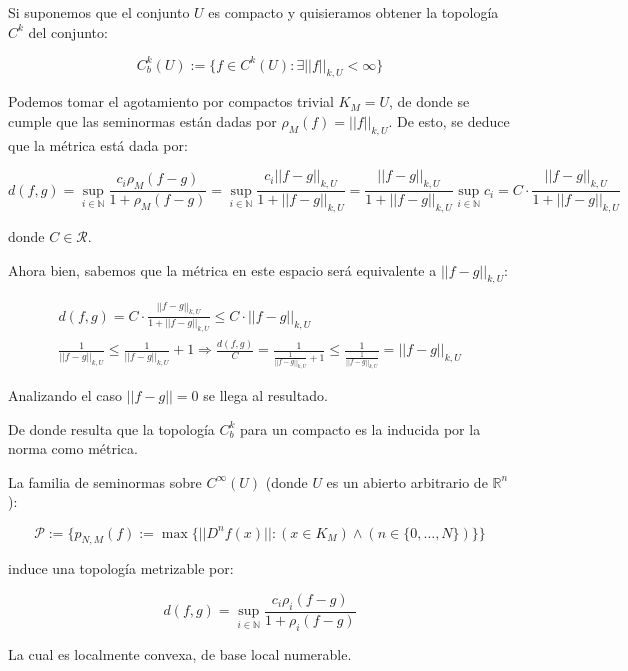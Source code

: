 \begin{rmrk}
	Si suponemos que el conjunto $U$ es compacto y quisieramos obtener la topología $C^k$ del conjunto:
	
	\begin{equation*}
		C^k_b(U) := \{f \in C^k(U): \exists ||f||_{k,U}  < \infty\}
	\end{equation*}
	
	Podemos tomar el agotamiento por compactos trivial $K_M = U$, de donde se cumple que las seminormas están dadas por $\rho_M(f) = ||f||_{k,U}$. De esto, se deduce que la métrica está dada por:
	
	\begin{equation*}
		d(f,g) = \sup_{i \in \mathbb{N}} \frac{c_i \rho_M(f-g)}{1+\rho_M(f-g)} = \sup_{i \in \mathbb{N}} \frac{c_i ||f-g||_{k,U}}{1+||f-g||_{k,U}} = \frac{ ||f-g||_{k,U}}{1+||f-g||_{k,U}} \sup_{i \in \mathbb{N}} c_i  = C\cdot\frac{ ||f-g||_{k,U}}{1+||f-g||_{k,U}}
	\end{equation*}
	
	donde $C\in \mathcal{R}$.
	
	Ahora bien, sabemos que la métrica en este espacio será equivalente a $||f-g||_{k,U}$:
	
	\begin{align*}
		d(f,g) = C\cdot\frac{ ||f-g||_{k,U}}{1+||f-g||_{k,U}} \leq C\cdot ||f-g||_{k,U} \\
		\frac{1}{||f-g||_{k,U}} \leq \frac{1}{||f-g||_{k,U}} + 1 \Rightarrow \frac{d(f,g)}{C}= \frac{1}{\frac{1}{||f-g||_{k,U}} + 1} \leq \frac{1}{\frac{1}{||f-g||_{k,U}}} = ||f-g||_{k,U}
	\end{align*}
	
	Analizando el caso $||f -g|| = 0$ se llega al resultado.
	
	De donde resulta que la topología $C^k_b$ para un compacto es la inducida por la norma como métrica.
\end{rmrk}

\begin{prop}
	La familia de seminormas sobre $C^\infty(U)$ (donde $U$ es un abierto arbitrario de $\mathbb{R}^n$):
	
	\begin{equation*}
		\mathcal{P} := \{p_{N,M} (f) := \max \{ ||D^n f(x)||: (x \in K_M) \land ( n\in \{0,\dots,N\} )  \} \}
	\end{equation*}
	
	induce una topología metrizable por:
	
	\begin{equation*}
		d(f,g) = \sup_{i \in \mathbb{N}} \frac{c_i \rho_i(f-g)}{1+\rho_i(f-g)}
	\end{equation*}
	
	La cual es localmente convexa, de base local numerable.
\end{prop}



